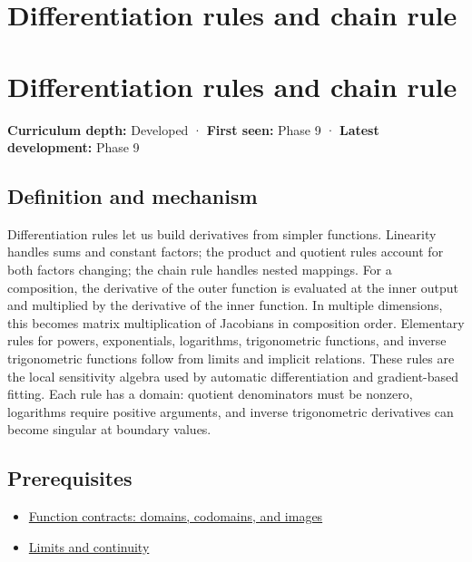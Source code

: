 \hypertarget{appendix-d9f70bdfbc92}{}
\section*{Differentiation rules and chain rule}
\section{Differentiation rules and chain rule}\label{appendix-d9f70bdfbc92-differentiation-rules-and-chain-rule}

\textbf{Curriculum depth:} Developed · \textbf{First seen:} Phase 9 · \textbf{Latest development:} Phase 9

\subsection{Definition and mechanism}\label{appendix-d9f70bdfbc92-definition-and-mechanism}

Differentiation rules let us build derivatives from simpler functions. Linearity handles sums and constant factors; the product and quotient rules account for both factors changing; the chain rule handles nested mappings. For a composition, the derivative of the outer function is evaluated at the inner output and multiplied by the derivative of the inner function. In multiple dimensions, this becomes matrix multiplication of Jacobians in composition order. Elementary rules for powers, exponentials, logarithms, trigonometric functions, and inverse trigonometric functions follow from limits and implicit relations. These rules are the local sensitivity algebra used by automatic differentiation and gradient-based fitting. Each rule has a domain: quotient denominators must be nonzero, logarithms require positive arguments, and inverse trigonometric derivatives can become singular at boundary values.

\subsection{Prerequisites}\label{appendix-d9f70bdfbc92-prerequisites}

\begin{itemize}
\tightlist
\item
  \hyperref[appendix-a59658325cd6]{Function contracts: domains, codomains, and images}
\item
  \hyperref[appendix-fecc1847f5a3]{Limits and continuity}
\end{itemize}

